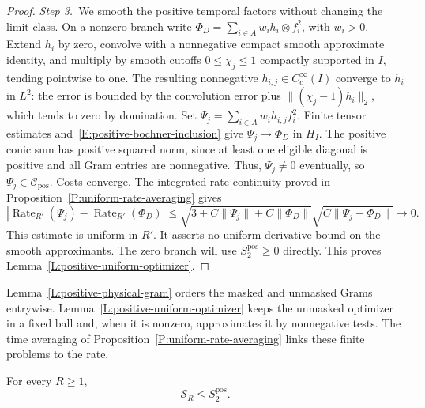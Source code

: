 \begin{proof}
  \medskip
  \noindent\textit{Step 3.~}We smooth the positive temporal factors without
  changing the limit class.
  On a nonzero branch write $\Phi_D = \sum_{i\in A}w_i h_i\otimes f_i^2$, with
  $w_i > 0$. Extend $h_i$ by zero, convolve with a nonnegative compact smooth
  approximate identity, and multiply by smooth cutoffs $0 \le \chi_j \le 1$
  compactly supported in $I$, tending pointwise to one. The resulting
  nonnegative $h_{i,j} \in C_c^\infty(I)$ converge to $h_i$ in $L^2$: the error
  is bounded by the convolution error plus $\|(\chi_j-1)h_i\|_2$, which tends to
  zero by domination. Set $\Psi_j = \sum_{i\in A}w_i h_{i,j}f_i^2$. Finite
  tensor estimates and~\eqref{E:positive-bochner-inclusion} give $\Psi_j \to
  \Phi_D$ in $H_I$. The positive conic sum has positive squared norm, since at
  least one eligible diagonal is positive and all Gram entries are nonnegative.
  Thus, $\Psi_j \ne 0$ eventually, so $\Psi_j \in \mathcal{C}_{\mathrm{pos}}$.
  Costs converge. The integrated rate continuity proved in
  Proposition~\ref{P:uniform-rate-averaging} gives
  \begin{equation}\label{E:positive-rate-continuity}
    |\operatorname{Rate}_{R'}(\Psi_j)-\operatorname{Rate}_{R'}(\Phi_D)|
    \le\sqrt{3+C\|\Psi_j\|+C\|\Phi_D\|}
    \sqrt{C\|\Psi_j-\Phi_D\|}\longrightarrow0 .
  \end{equation}
  This estimate is uniform in $R'$. It asserts no uniform derivative bound on
  the smooth approximants. The zero branch will use $S_2^{\mathrm{pos}} \ge 0$
  directly. This proves Lemma~\ref{L:positive-uniform-optimizer}.
\end{proof}

Lemma~\ref{L:positive-physical-gram} orders the masked and unmasked Grams
entrywise. Lemma~\ref{L:positive-uniform-optimizer} keeps the unmasked optimizer
in a fixed ball and, when it is nonzero, approximates it by nonnegative tests.
The time averaging of Proposition~\ref{P:uniform-rate-averaging} links these
finite problems to the rate.

\begin{proposition}
  \label{P:positive-signed-comparison}
  For every $R \ge 1$,
  \begin{equation}\label{E:positive-signed-comparison}
    \mathcal{S}_R\le S_2^{\mathrm{pos}} .
  \end{equation}
\end{proposition}

